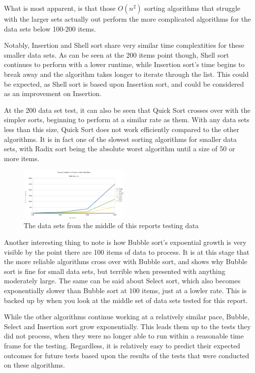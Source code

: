 \documentclass{acm_proc_article-sp}
\begin{document}
What is most apparent, is that those \begin{math}O(n^2)\end{math} sorting algorithms
that struggle with the larger sets actually out perform the more complicated algorithms
for the data sets below 100-200 items.

Notably, Insertion and Shell sort share very similar time complextities for these smaller 
data sets. As can be seen at the 200 items point though, Shell sort continues
to perform with a lower runtime, while Insertion sort's time begins to break away and 
the algorithm takes longer to iterate through the list. This could be expected, as Shell
sort is based upon Insertion sort, and could be considered as an improvement on Insertion.

At the 200 data set test, it can also be seen that Quick Sort crosses over with the simpler
sorts, beginning to perform at a similar rate as them. With any data sets less than this size,
Quick Sort does not work efficiently compared to the other algorithms. It is in fact one of the 
slowest sorting algorithms for smaller data sets, with Radix sort being the absolute worst 
algorithm until a size of 50 or more items.

\begin{figure}[h]
\centering
\includegraphics[width=0.48\textwidth]{img/graph_middle.png}
\caption{The data sets from the middle of this reports testing data}
\end{figure}

Another interesting thing to note is how Bubble sort's expoential growth is very visible by
the point there are 100 items of data to process. It is at this stage that the more reliable
algorithms cross over with Bubble sort, and shows why Bubble sort is fine for small data
sets, but terrible when presented with anything moderately large. The same can be said about
Select sort, which also becomes exponentially slower than Bubble sort at 100 items, just
at a lowler rate. This is backed up by when you look at the middle set of data sets tested
for this report.

While the other algorithms continue working at a relatively similar pace, Bubble, Select
and Insertion sort grow exponentially. This leads them up to the tests they did not process, when they were
no longer able to run within a reasonable time frame for the testing. Regardless, it is
relatively easy to predict their expected outcomes for future tests based upon the 
results of the tests that were conducted on these algorithms.
\end{document}
